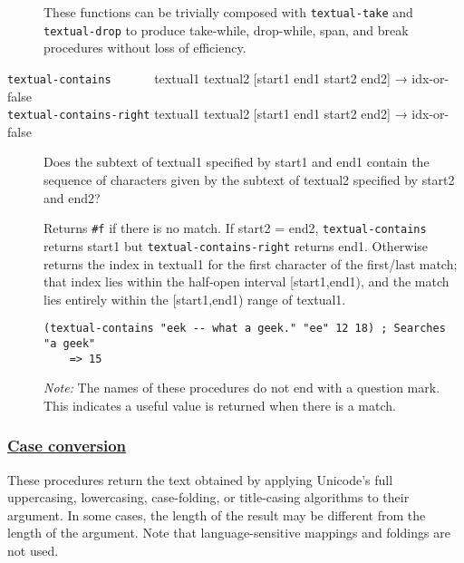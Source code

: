 \begin{description}
These functions can be trivially composed with \texttt{textual-take} and
\texttt{textual-drop} to produce take-while, drop-while, span, and break
procedures without loss of efficiency.
\item[ \href{}{} \href{}{} \texttt{textual-contains~~~~~~} textual1
textual2 {[}start1 end1 start2 end2{]} → idx-or-false\\
\texttt{textual-contains-right} textual1 textual2 {[}start1 end1 start2
end2{]} → idx-or-false ]
Does the subtext of textual1 specified by start1 and end1 contain the
sequence of characters given by the subtext of textual2 specified by
start2 and end2?

Returns \texttt{\#f} if there is no match. If start2 = end2,
\texttt{textual-contains} returns start1 but
\texttt{textual-contains-right} returns end1. Otherwise returns the
index in textual1 for the first character of the first/last match; that
index lies within the half-open interval {[}start1,end1), and the match
lies entirely within the {[}start1,end1) range of textual1.

\begin{verbatim}
(textual-contains "eek -- what a geek." "ee" 12 18) ; Searches "a geek"
    => 15
\end{verbatim}

\emph{Note:} The names of these procedures do not end with a question
mark. This indicates a useful value is returned when there is a match.
\end{description}

\subsubsection{\texorpdfstring{\href{}{Case
conversion}}{Case conversion}}\label{case-conversion}

\begin{description}
\tightlist
\item[ \href{}{} \href{}{} \href{}{} \href{}{} \texttt{textual-upcase~~}
textual → text\\
\texttt{textual-downcase} textual → text\\
\texttt{textual-foldcase} textual → text\\
\texttt{textual-titlecase} textual → text ]
These procedures return the text obtained by applying Unicode's full
uppercasing, lowercasing, case-folding, or title-casing algorithms to
their argument. In some cases, the length of the result may be different
from the length of the argument. Note that language-sensitive mappings
and foldings are not used.
\end{description}

